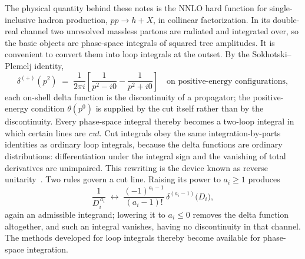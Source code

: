 \documentclass[11pt]{article}
\begin{document}
The physical quantity behind these notes is the NNLO hard function
for single-inclusive hadron production, $pp \to h + X$, in collinear
factorization.  In its double-real channel two unresolved massless
partons are radiated and integrated over, so the basic objects are
phase-space integrals of squared tree amplitudes.  It is convenient
to convert them into loop integrals at the outset.  By the
Sokhotski--Plemelj identity,
\begin{equation}
  \delta^{(+)}(p^2) \;=\;
  \frac{1}{2\pi i}\left[\frac{1}{p^2 - i0} - \frac{1}{p^2 + i0}\right]
  \quad\text{on positive-energy configurations},
\end{equation}
each on-shell delta function is the discontinuity of a propagator;
the positive-energy condition $\theta(p^0)$ is supplied by the cut
itself rather than by the discontinuity.  Every phase-space integral
thereby becomes a two-loop integral in which certain lines are
\emph{cut}.  Cut integrals obey the same integration-by-parts
identities as ordinary loop integrals, because the delta functions are
ordinary distributions: differentiation under the integral sign and
the vanishing of total derivatives are unimpaired.  This rewriting is
the device known as reverse unitarity~\cite{am}.  Two rules govern a cut line.
Raising its power to $a_i \ge 1$ produces
\begin{equation}
  \frac{1}{D_i^{\,a_i}} \;\longleftrightarrow\;
  \frac{(-1)^{a_i-1}}{(a_i-1)!}\,
  \delta^{(a_i-1)}\big(D_i\big) ,
  \label{eq:cutpower}
\end{equation}
again an admissible integrand; lowering it to $a_i \le 0$ removes the
delta function altogether, and such an integral vanishes, having no
discontinuity in that channel.  The methods developed for loop
integrals thereby become available for phase-space integration.
\end{document}
